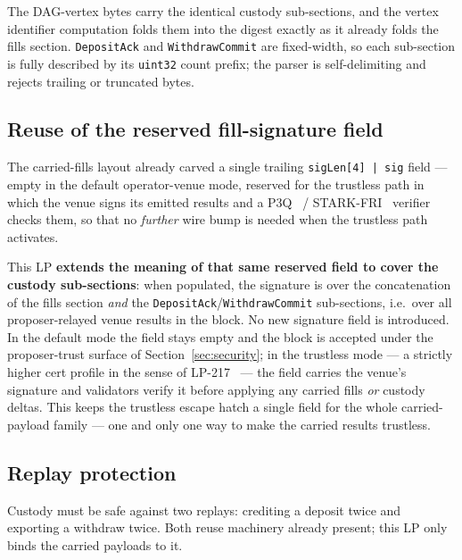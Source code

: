 The DAG-vertex bytes carry the identical custody sub-sections, and the
vertex identifier computation folds them into the digest exactly as it
already folds the fills section. \texttt{DepositAck} and
\texttt{WithdrawCommit} are fixed-width, so each sub-section is fully
described by its \texttt{uint32} count prefix; the parser is
self-delimiting and rejects trailing or truncated bytes.

\subsection{Reuse of the reserved fill-signature field}
\label{sec:reserved}

The carried-fills layout already carved a single trailing
\texttt{sigLen[4] | sig} field --- empty in the default operator-venue
mode, reserved for the trustless path in which the venue signs its
emitted results and a P3Q~\cite{lp218,lp219} / STARK-FRI~\cite{lp221}
verifier checks them, so that no \emph{further} wire bump is needed when
the trustless path activates.

This LP \textbf{extends the meaning of that same reserved field to
cover the custody sub-sections}: when populated, the signature is over
the concatenation of the fills section \emph{and} the
\texttt{DepositAck}/\texttt{WithdrawCommit} sub-sections, i.e.\ over all
proposer-relayed venue results in the block. No new signature field is
introduced. In the default mode the field stays empty and the block is
accepted under the proposer-trust surface of
Section~\ref{sec:security}; in the trustless mode --- a strictly higher
cert profile in the sense of LP-217~\cite{lp217} --- the field carries
the venue's signature and validators verify it before applying any
carried fills \emph{or} custody deltas. This keeps the trustless escape hatch a
single field for the whole carried-payload family --- one and only one
way to make the carried results trustless.

\subsection{Replay protection}
\label{sec:replay}

Custody must be safe against two replays: crediting a deposit twice and
exporting a withdraw twice. Both reuse machinery already present; this
LP only binds the carried payloads to it.

